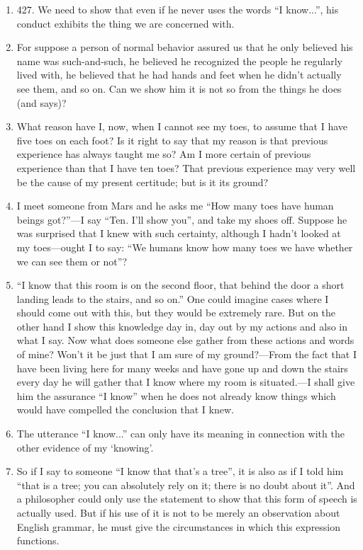 \documentclass{book}
\begin{document}
\begin{enumerate}
\item

427. We need to show that even if he never uses the words ``I know...'', his
conduct exhibits the thing we are concerned with.

\item
For suppose a person of normal behavior assured us that he only believed his
name was such-and-such, he believed he recognized the people he regularly lived
with, he believed that he had hands and feet when he didn't actually see them,
and so on. Can we show him it is not so from the things he does (and says)?

\item
What reason have I, now, when I cannot see my toes, to assume that I have five
toes on each foot?  Is it right to say that my reason is that previous
experience has always taught me so? Am I more certain of previous experience
than that I have ten toes?  That previous experience may very well be the cause
of my present certitude; but is it its ground?

\item
I meet someone from Mars and he asks me ``How many toes have human beings
got?''---I say ``Ten. I'll show you'', and take my shoes off. Suppose he was
surprised that I knew with such certainty, although I hadn't looked at my
toes---ought I to say: ``We humans know how many toes we have whether we can
see them or not''?

\item
``I know that this room is on the second floor, that behind the door a short
landing leads to the stairs, and so on.'' One could imagine cases where I
should come out with this, but they would be extremely rare. But on the other
hand I show this knowledge day in, day out by my actions and also in what I
say.  Now what does someone else gather from these actions and words of mine?
Won't it be just that I am sure of my ground?---From the fact that I have been
living here for many weeks and have gone up and down the stairs every day he
will gather that I know where my room is situated.---I shall give him the
assurance ``I know'' when he does not already know things which would have
compelled the conclusion that I knew.

\item
The utterance ``I know...'' can only have its meaning in connection with the
other evidence of my `knowing'.

\item
So if I say to someone ``I know that that's a tree'', it is also as if I told
him ``that is a tree; you can absolutely rely on it; there is no doubt about
it''. And a philosopher could only use the statement to show that this form of
speech is actually used. But if his use of it is not to be merely an
observation about English grammar, he must give the circumstances in which this
expression functions.


\end{enumerate}
\end{document}

